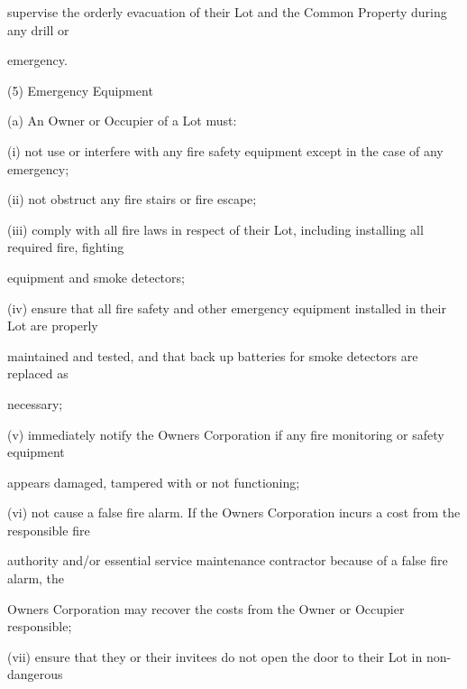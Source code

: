 \documentclass{article}
\begin{document}
{\fontsize{10.02}{1}supervise the orderly evacuation of their Lot and the Common Property during any drill or }

{\fontsize{10.02}{1}emergency. }

{\fontsize{9.962}{1}(5) Emergency Equipment }

{\fontsize{9.962}{1}(a) An Owner or Occupier of a Lot must: }

{\fontsize{9.962}{1}(i) not use or interfere with any fire safety equipment except in the case of any emergency; }

{\fontsize{9.962}{1}(ii) not obstruct any fire stairs or fire escape; }

{\fontsize{9.962}{1}(iii) comply with all fire laws in respect of their Lot, including installing all required fire, fighting }

{\fontsize{10.02}{1}equipment and smoke detectors; }

\newpage



















{\fontsize{9.962}{1}(iv) ensure that all fire safety and other emergency equipment installed in their Lot are properly }

{\fontsize{10.02}{1}maintained and tested, and that back up batteries for smoke detectors are replaced as }

{\fontsize{10.02}{1}necessary; }

{\fontsize{9.962}{1}(v) immediately notify the Owners Corporation if any fire monitoring or safety equipment }

{\fontsize{10.02}{1}appears damaged, tampered with or not functioning; }

{\fontsize{9.962}{1}(vi) not cause a false fire alarm. If the Owners Corporation incurs a cost from the responsible fire }

{\fontsize{10.02}{1}authority and/or essential service maintenance contractor because of a false fire alarm, the }

{\fontsize{10.02}{1}Owners Corporation may recover the costs from the Owner or Occupier responsible; }

{\fontsize{9.962}{1}(vii) ensure that they or their invitees do not open the door to their Lot in non-dangerous }
\end{document}
